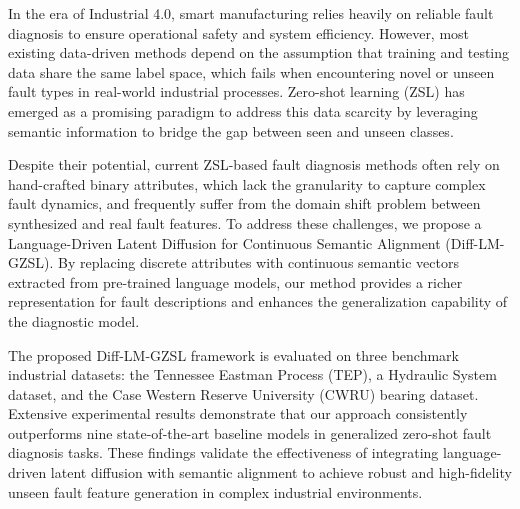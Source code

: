 In the era of Industrial 4.0, smart manufacturing relies heavily on reliable fault diagnosis to ensure operational safety and system efficiency. However, most existing data-driven methods depend on the assumption that training and testing data share the same label space, which fails when encountering novel or unseen fault types in real-world industrial processes. Zero-shot learning (ZSL) has emerged as a promising paradigm to address this data scarcity by leveraging semantic information to bridge the gap between seen and unseen classes.

Despite their potential, current ZSL-based fault diagnosis methods often rely on hand-crafted binary attributes, which lack the granularity to capture complex fault dynamics, and frequently suffer from the domain shift problem between synthesized and real fault features. To address these challenges, we propose a Language-Driven Latent Diffusion for Continuous Semantic Alignment (Diff-LM-GZSL). By replacing discrete attributes with continuous semantic vectors extracted from pre-trained language models, our method provides a richer representation for fault descriptions and enhances the generalization capability of the diagnostic model.

The proposed Diff-LM-GZSL framework is evaluated on three benchmark industrial datasets: the Tennessee Eastman Process (TEP), a Hydraulic System dataset, and the Case Western Reserve University (CWRU) bearing dataset. Extensive experimental results demonstrate that our approach consistently outperforms nine state-of-the-art baseline models in generalized zero-shot fault diagnosis tasks. These findings validate the effectiveness of integrating language-driven latent diffusion with semantic alignment to achieve robust and high-fidelity unseen fault feature generation in complex industrial environments.